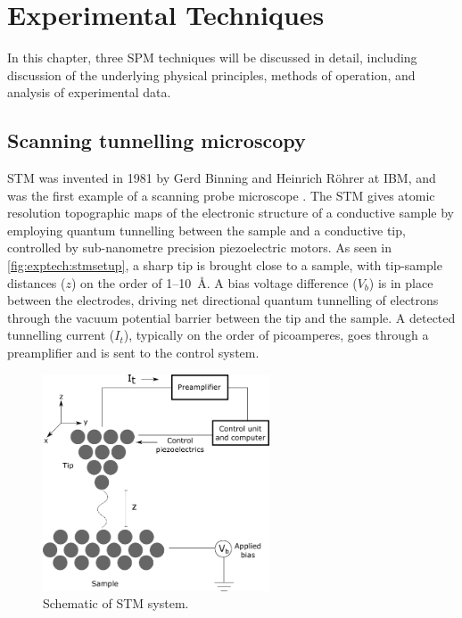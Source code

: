 
\chapter{Experimental Techniques}
\label{ch:exptech}

In this chapter, three \acf{SPM} techniques will be discussed in detail, including discussion of the underlying physical principles, methods of operation, and analysis of experimental data.



\section{Scanning tunnelling microscopy}

\Acf{STM} was invented in 1981 by Gerd Binning and Heinrich R\"ohrer at IBM, and was the first example of a scanning probe microscope \citep{binnig1982surface}. The \ac{STM} gives atomic resolution topographic maps of the electronic structure of a conductive sample by employing quantum tunnelling between the sample and a conductive tip, controlled by sub-nanometre precision piezoelectric motors. As seen in \autoref{fig:exptech:stmsetup}, a sharp tip is brought close to a sample, with tip-sample distances ($z$) on the order of 1--\SI{10}{\angstrom}. A bias voltage difference ($V_b$) is in place between the electrodes, driving net directional quantum tunnelling of electrons through the vacuum potential barrier between the tip and the sample. A detected tunnelling current ($I_t$), typically on the order of picoamperes, goes through a preamplifier and is sent to the control system.

\begin{figure} [h]
    \centering
    \includegraphics[width=0.6\textwidth]{pictures/stm_diagram.png}
    \caption{Schematic of STM system.}
    \label{fig:exptech:stmsetup}
\end{figure}


